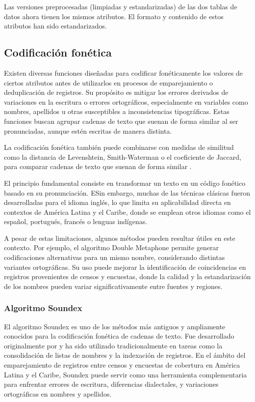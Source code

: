 \documentclass[
  12pt,
]{book}
\begin{document}
Las versiones preprocesadas (limpiadas y estandarizadas) de las dos tablas de datos ahora tienen los mismos atributos. El formato y contenido de estos atributos han sido estandarizados.

\subsection{Codificación fonética}\label{codificaciuxf3n-fonuxe9tica}

Existen diversas funciones diseñadas para codificar fonéticamente los valores de ciertos atributos antes de utilizarlos en procesos de emparejamiento o deduplicación de registros. Su propósito es mitigar los errores derivados de variaciones en la escritura o errores ortográficos, especialmente en variables como nombres, apellidos u otras susceptibles a inconsistencias tipográficas. Estas funciones buscan agrupar cadenas de texto que suenan de forma similar al ser pronunciadas, aunque estén escritas de manera distinta.

La codificación fonética también puede combinarse con medidas de similitud como la distancia de Levenshtein, Smith-Waterman o el coeficiente de Jaccard, para comparar cadenas de texto que suenan de forma similar \citep{navarro2001guided, nauman2022introduction}.

El principio fundamental consiste en transformar un texto en un código fonético basado en su pronunciación. ESin embargo, muchas de las técnicas clásicas fueron desarrolladas para el idioma inglés, lo que limita su aplicabilidad directa en contextos de América Latina y el Caribe, donde se emplean otros idiomas como el español, portugués, francés o lenguas indígenas.

A pesar de estas limitaciones, algunos métodos pueden resultar útiles en este contexto. Por ejemplo, el algoritmo Double Metaphone permite generar codificaciones alternativas para un mismo nombre, considerando distintas variantes ortográficas. Su uso puede mejorar la identificación de coincidencias en registros provenientes de censos y encuestas, donde la calidad y la estandarización de los nombres pueden variar significativamente entre fuentes y regiones.

\subsubsection{Algoritmo Soundex}\label{algoritmo-soundex}

El algoritmo Soundex es uno de los métodos más antiguos y ampliamente conocidos para la codificación fonética de cadenas de texto. Fue desarrollado originalmente por \citep{odell1918soundex} y ha sido utilizado tradicionalmente en tareas como la consolidación de listas de nombres y la indexación de registros. En el ámbito del emparejamiento de registros entre censos y encuestas de cobertura en América Latina y el Caribe, Soundex puede servir como una herramienta complementaria para enfrentar errores de escritura, diferencias dialectales, y variaciones ortográficas en nombres y apellidos.
\end{document}
